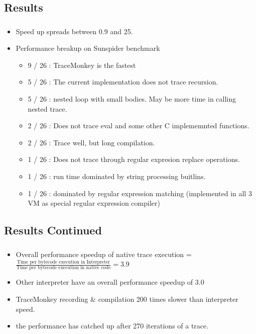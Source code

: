 \documentclass[mathserif,10pt]{beamer}
\newcommand{\cmt}[1]{}
\begin{document}
\subsection{Results}
\frame
{
  \frametitle{\subsecname}
  \begin{itemize}
    \item Speed up spreads between 0.9 and 25. 
    \item Performance breakup on Sunspider benchmark
    \begin{itemize}  
      \item 9 / 26 : TraceMonkey is the fastest
      \item 5 / 26 : The current implementation does not trace recursion.
      \item 5 / 26 : nested loop with small bodies. May be more time in calling nested trace.
      \item 2 / 26 : Does not trace eval and some other C implememnted functions.
      \item 2 / 26 : Trace well, but long compilation.
      \item 1 / 26 : Does not trace through regular expresion replace operations.
      \item 1 / 26 : run time dominated by string processing buitlins.
      \item 1 / 26 : dominated by regular expression matching (implemented in all 3 VM as special regular expression compiler) 
    \end{itemize}  
  \end{itemize}
}

\subsection{Results Continued}
\frame
{
  \frametitle{\subsecname}
  \begin{itemize}
    \item Overall performance speedup of native trace execution  = $\frac{\text{Time per bytecode execution in Interpreter}}{\text{Time per bytecode execution in native code}  } = 3.9$
      \cmt{
    \item Native trace takes 9 cycles/ byte code as compared to the interpreter ( 35 cycle/ bytecode) 
      }
    \item Other interpreter have an overall performance speedup of 3.0
    \item TraceMonkey recording \& compilation 200 times slower than interpreter speed.
    \item the performance has catched up after 270 iterations of a trace.
  \end{itemize}
}
\end{document}
